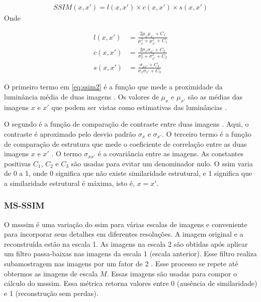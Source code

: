 \begin{equation}
\begin{aligned}
SSIM(x,x') = l(x,x') \times c(x,x') \times s(x,x') 
\end{aligned}
\end{equation}
Onde

\begin{equation}
\label{eq:ssim2}
\begin{aligned}
l(x,x') &= \frac{2\mu_x\mu_{x'} + C_1}{\mu_{x}^2+\mu_{x'}^2 + C_1} \\
c(x,x') &= \frac{2\sigma_x\sigma_{x'} + C_2}{\sigma_{x}^2+\sigma_{x'}^2 + C_2} \\
s(x,x') &= \frac{\sigma_{xx'}+ C_3}{\sigma_{x}\sigma_{x'} + C_3}	
\end{aligned} 
\end{equation}


O primeiro termo em \ref{eq:ssim2} é a função que mede a proximidade da luminância média de duas imagens \cite{hore2010image}. Os valores de $\mu_x$ e $\mu_{x'}$ são as médias das imagens $x$ e $x'$ que podem ser vistas como estimativas das luminâncias \cite{wang2003multiscale}. 

O segundo é a função de comparação de contraste entre duas imagens \cite{hore2010image}. Aqui, o contraste é aproximado pelo desvio padrão $\sigma_x$ e $\sigma_{x'}$.
O terceiro termo é a função de comparação de estrutura que mede o coeficiente de correlação entre as duas imagens $x$ e $x'$ \cite{hore2010image}. O termo $\sigma_{xx'}$ é a covariância entre as imagens.  As constantes positivas $C_1$, $C_2$ e $C_3$ são usadas para evitar um denominador nulo.
O \acrshort{ssim} varia de 0 a 1, onde 0 significa que não existe similaridade estrutural, e 1 significa que a similaridade estrutural é máxima, isto é, $x = x'$.


\subsubsection{MS-SSIM}
O \acrshort{msssim} \cite{wang2003multiscale} é uma variação do \acrshort{ssim} para várias escalas de imagens e conveniente para incorporar seus detalhes em diferentes resoluções. A imagem original e a reconstruída estão na escala 1. As imagens na escala 2 são obtidas após aplicar um filtro passa-baixas nas imagens da escala 1 (escala anterior). Esse filtro realiza subamostragem nas imagens por um fator de 2 \cite{wang2003multiscale}. Esse processo se repete até obtermos as imagens de escala $M$. 
Essas imagens são usadas para compor o cálculo do \acrshort{msssim}. Essa métrica retorna valores entre 0 (ausência de similaridade) e 1 (reconstrução sem perdas). 